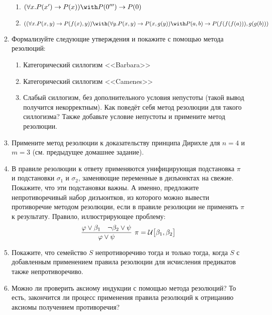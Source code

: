 \documentclass[10pt,a4paper,oneside]{article}
\begin{document}
\begin{enumerate}
\begin{enumerate}
\item $(\forall x.P(x') \rightarrow P(x)) \with P(0''') \rightarrow P(0)$
\item $((\forall x.P(x,y)\rightarrow P(f(x),y)) \with (\forall y.P(x,y) \rightarrow P(x,g(y)) \with P(a,b)\rightarrow P(f(f(f(a))),g(g(b)))$
\end{enumerate}
\item Формализуйте следующие утверждения и покажите с помощью метода резолюций:
\begin{enumerate}
\item Категорический силлогизм <<Barbara>>
\item Категорический силлогизм <<Camenes>>
\item Слабый силлогизм, без дополнительного условия непустоты (такой вывод получится некорректным).
Как поведёт себя метод резолюции для такого силлогизма? Также добавьте условие непустоты и примените метод резолюции.
\end{enumerate}
\item Примените метод резолюции к доказательству принципа Дирихле для $n=4$ и $m=3$ (см. предыдущее домашнее задание).
\item В правиле резолюции к ответу применяются унифицирующая подстановка $\pi$ 
и подстановки $\sigma_1$ и $\sigma_2$, заменяющие переменные в дизъюнктах на свежие. 
Покажите, что эти подстановки важны. А именно, предложите непротиворечивый набор дизъюнтков, из которого можно вывести противоречие
методом резолюции, если в правиле резолюции не применять $\pi$ к результату. Правило, иллюстрирующее проблему:
$$\infer[\pi = {\mathcal{U}\big[ \beta_1, \beta_2 \big]}]{\varphi\vee\psi}{\varphi\vee\beta_1\quad\neg\beta_2\vee\psi}$$
\item Покажите, что семейство $S$ непротиворечиво тогда и только тогда, когда $S$ с добавленным 
применением правила резолюции для исчисления предикатов также непротиворечиво.
\item Можно ли проверить аксиому индукции с помощью метода резолюций? То есть, закончится ли процесс 
применения правила резолюций к отрицанию аксиомы получением противоречия?
\end{enumerate}
\end{document}
